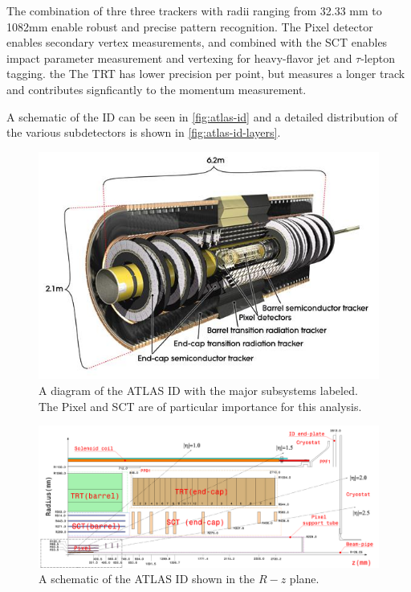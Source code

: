 The combination of thre three trackers with radii ranging from 32.33 mm to 1082mm enable robust and precise pattern recognition. The Pixel detector enables secondary vertex measurements, and combined with the \ac{SCT} enables impact parameter measurement and vertexing for heavy-flavor jet and $\tau$-lepton tagging. the The \ac{TRT} has lower precision per point, but measures a longer track and contributes signficantly to the momentum measurement.


A schematic of the \ac{ID} can be seen in \autoref{fig:atlas-id} and a detailed distribution of the various subdetectors is shown in \autoref{fig:atlas-id-layers}. 


\begin{figure}[htbp]
\centering
\includegraphics[width=.8\textwidth]{figures/Detector/atlas-ID.jpg}
\caption{A diagram of the \ac{ATLAS} \ac{ID} with the major subsystems labeled. The Pixel and \ac{SCT} are of particular importance for this analysis.}
\label{fig:atlas-id}
\end{figure}

\begin{figure}[htbp]
\centering
\includegraphics[width=.8\textwidth]{figures/Detector/atlas-id-layers.png}
\caption{A schematic of the \ac{ATLAS} \ac{ID} shown in the $R-z$ plane. \cite{id-cutaway}}
\label{fig:atlas-id-layers}
\end{figure}

